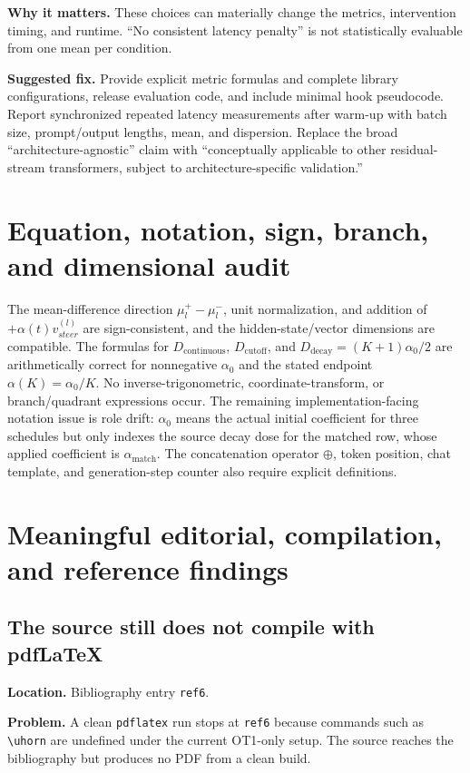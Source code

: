 \documentclass[11pt]{article}
\newcommand{\findinglabel}[1]{\textbf{#1}}
\begin{document}
\findinglabel{Why it matters.} These choices can materially change the metrics, intervention timing, and runtime.  ``No consistent latency penalty'' is not statistically evaluable from one mean per condition.

\findinglabel{Suggested fix.} Provide explicit metric formulas and complete library configurations, release evaluation code, and include minimal hook pseudocode.  Report synchronized repeated latency measurements after warm-up with batch size, prompt/output lengths, mean, and dispersion.  Replace the broad ``architecture-agnostic'' claim with ``conceptually applicable to other residual-stream transformers, subject to architecture-specific validation.''

\section*{Equation, notation, sign, branch, and dimensional audit}

The mean-difference direction $\mu_l^+-\mu_l^-$, unit normalization, and addition of $+\alpha(t)v_{steer}^{(l)}$ are sign-consistent, and the hidden-state/vector dimensions are compatible.  The formulas for $D_{\mathrm{continuous}}$, $D_{\mathrm{cutoff}}$, and $D_{\mathrm{decay}}=(K+1)\alpha_0/2$ are arithmetically correct for nonnegative $\alpha_0$ and the stated endpoint $\alpha(K)=\alpha_0/K$.  No inverse-trigonometric, coordinate-transform, or branch/quadrant expressions occur.  The remaining implementation-facing notation issue is role drift: $\alpha_0$ means the actual initial coefficient for three schedules but only indexes the source decay dose for the matched row, whose applied coefficient is $\alpha_{\mathrm{match}}$.  The concatenation operator $\oplus$, token position, chat template, and generation-step counter also require explicit definitions.

\section*{Meaningful editorial, compilation, and reference findings}

\subsection*{The source still does not compile with pdfLaTeX}

\findinglabel{Location.} Bibliography entry \texttt{ref6}.

\findinglabel{Problem.} A clean \texttt{pdflatex} run stops at \texttt{ref6} because commands such as \verb|\uhorn| are undefined under the current OT1-only setup.  The source reaches the bibliography but produces no PDF from a clean build.
\end{document}
